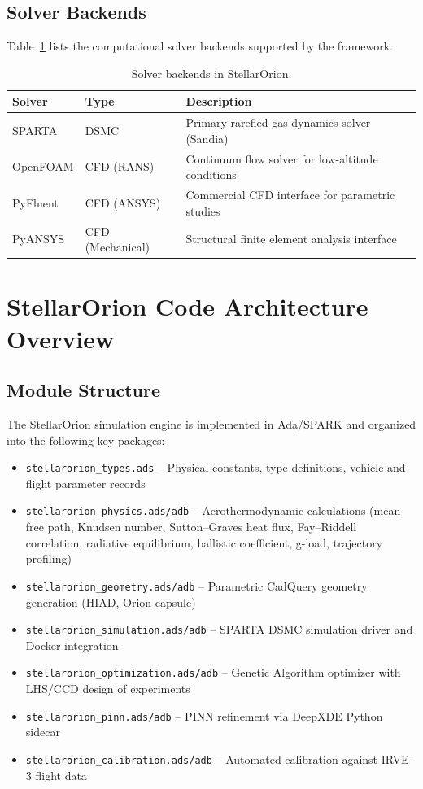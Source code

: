 \section{Solver Backends}
\label{sec:solver_backends}

Table~\ref{tab:solvers} lists the computational solver backends supported by the framework.

\begin{table}[H]
\centering
\caption{Solver backends in StellarOrion.}
\label{tab:solvers}
\begin{tabular}{lll}
\hline
\textbf{Solver} & \textbf{Type} & \textbf{Description} \\
\hline
SPARTA & DSMC & Primary rarefied gas dynamics solver (Sandia) \\
OpenFOAM & CFD (RANS) & Continuum flow solver for low-altitude conditions \\
PyFluent & CFD (ANSYS) & Commercial CFD interface for parametric studies \\
PyANSYS & CFD (Mechanical) & Structural finite element analysis interface \\
\hline
\end{tabular}
\end{table}

\chapter{StellarOrion Code Architecture Overview}
\label{app:code_architecture}

\section{Module Structure}

The StellarOrion simulation engine is implemented in Ada/SPARK and organized into the following key packages:

\begin{itemize}
    \item \texttt{stellarorion\_types.ads} -- Physical constants, type definitions, vehicle and flight parameter records
    \item \texttt{stellarorion\_physics.ads/adb} -- Aerothermodynamic calculations (mean free path, Knudsen number, Sutton--Graves heat flux, Fay--Riddell correlation, radiative equilibrium, ballistic coefficient, g-load, trajectory profiling)
    \item \texttt{stellarorion\_geometry.ads/adb} -- Parametric CadQuery geometry generation (HIAD, Orion capsule)
    \item \texttt{stellarorion\_simulation.ads/adb} -- SPARTA DSMC simulation driver and Docker integration
    \item \texttt{stellarorion\_optimization.ads/adb} -- Genetic Algorithm optimizer with LHS/CCD design of experiments
    \item \texttt{stellarorion\_pinn.ads/adb} -- PINN refinement via DeepXDE Python sidecar
    \item \texttt{stellarorion\_calibration.ads/adb} -- Automated calibration against IRVE-3 flight data
\end{itemize}

